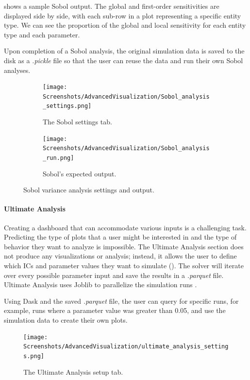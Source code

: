 shows a sample Sobol output. 
The global and first-order sensitivities are displayed side by side, with each sub-row in a plot representing a specific entity type. 
We can see the proportion of the global and local sensitivity for each entity type and each parameter.

Upon completion of a Sobol analysis, the original simulation data is saved to the disk as a \textit{.pickle} file so that the user can reuse the data and run their own Sobol analyses. 

\begin{figure}[h!]
    \centering
    \begin{subfigure}{0.49\linewidth}
        \centering
        \captionsetup{width=1\linewidth}
        \texttt{[image: Screenshots/AdvancedVisualization/Sobol\_analysis\_settings.png]}
        \caption{
            The Sobol settings tab. 
        }
        \label{fig:ss:av:Sobol_analysis_settings}
    \end{subfigure}
    \hfill
    \begin{subfigure}{0.49\linewidth}
        \centering
        \captionsetup{width=1\linewidth}
        \texttt{[image: Screenshots/AdvancedVisualization/Sobol\_analysis\_run.png]}
        \caption{
            Sobol’s expected output. 
        }
        \label{fig:ss:av:Sobol_analysis_run}
    \end{subfigure}
    \caption{Sobol variance analysis settings and output. }
\end{figure}

\paragraph{Ultimate Analysis}
\label{sec:ultimate_analysis}
Creating a dashboard that can accommodate various inputs is a challenging task. 
Predicting the type of plots that a user might be interested in and the type of behavior they want to analyze is impossible. 
The Ultimate Analysis section does not produce any visualizations or analysis; instead, it allows the user to define which ICs and parameter values they want to simulate ().
The solver will iterate over every possible parameter input and save the results in a \textit{.parquet} file. 
Ultimate Analysis uses Joblib to parallelize the simulation runs \cite{joblib}. 

Using Dask and the saved \textit{.parquet} file, the user can query for specific runs, for example, runs where a parameter value was greater than 0.05, and use the simulation data to create their own plots.
\begin{figure}
    \centering
    \texttt{[image: Screenshots/AdvancedVisualization/ultimate\_analysis\_settings.png]}
    \caption{
        The Ultimate Analysis setup tab. 
    }
    \label{fig:ss:av:ultimate_analysis_settings}
\end{figure}

